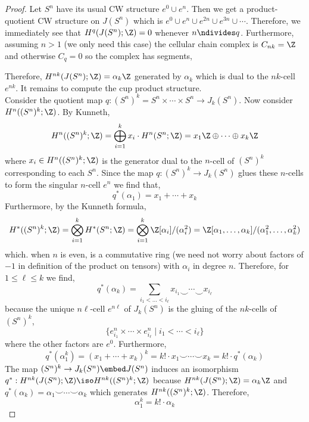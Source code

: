 \documentclass[12pt]{extarticle}
\begin{document}
\begin{proof}
Let $S^n$ have its usual CW structure $e^0 \cup e^n$. Then we get a product-quotient CW structure on $J(S^n)$ which is $e^0 \cup e^n \cup e^{2n} \cup e^{3n} \cup \cdots$. Therefore, we immediately see that $H^q(J(S^n); \Z) = 0$ whenever $n \ndivides q$. Furthermore, assuming $n > 1$ (we only need this case) the cellular chain complex is $C_{nk} = \Z$ and otherwise $C_q = 0$ so the complex has segments,
\begin{center}
\end{center}
Therefore, $H^{nk}(J(S^n); \Z) = \alpha_k \Z$ generated by $\alpha_k$ which is dual to the $nk$-cell $e^{nk}$. It remains to compute the cup product structure. 
\bigskip\\
Consider the quotient map $q : (S^n)^k = S^n \times \cdots \times S^n \to J_k(S^n)$. Now consider $H^n((S^n)^k; \Z)$. By Kunneth,
\[ H^n((S^n)^k; \Z) = \bigoplus_{i = 1}^k x_i \cdot H^n(S^n ; \Z) = x_1 \Z \oplus \cdots \oplus x_k \Z \]
where $x_i \in H^n((S^n)^k ; \Z)$ is the generator dual to the $n$-cell of $(S^n)^k$ corresponding to each $S^n$. Since the map $q : (S^n)^k \to J_k(S^n)$ glues these $n$-cells to form the singular $n$-cell $e^n$ we find that,
\[ q^*(\alpha_1) = x_1 + \cdots + x_k \]
Furthermore, by the Kunneth formula,
\[ H^*((S^n)^k ; \Z) = \bigotimes_{i = 1}^k H^*(S^n ; \Z) = \bigotimes_{i = 1}^k \Z[\alpha_i]/(\alpha_i^2) = \Z[\alpha_1, \dots, \alpha_k]/(\alpha_1^2, \dots, \alpha_k^2) \]
which. when $n$ is even, is a commutative ring (we need not worry about factors of $-1$ in definition of the product on tensors) with $\alpha_i$ in degree $n$. 
Therefore, for $1 \le \ell \le k$ we find,
\[ q^*(\alpha_k) = \sum_{i_1 < \dots < i_\ell} x_{i_1} \smile \cdots \smile x_{i_\ell} \]
because the unique $n\ell$-cell $e^{n\ell}$ of $J_k(S^n)$ is the gluing of the $nk$-cells of $(S^n)^k$,
\[ \{ e_{i_1}^{n} \times \cdots \times e_{i_\ell}^n \mid i_1 < \cdots < i_{\ell} \} \]
where the other factors are $e^0$. Furthermore,
\[ q^*(\alpha_1^k) = (x_1 + \cdots + x_k)^k = k! \cdot x_1 \smile \cdots \smile x_k = k! \cdot q^*(\alpha_k) \]
The map $(S^n)^k \to J_k(S^n) \embed J(S^n)$ induces an isomorphism $q^* : H^{nk}(J(S^n); \Z) \iso H^{nk}((S^n)^k ; \Z)$ because $H^{nk}(J(S^n); \Z) = \alpha_k \Z$ and $q^*(\alpha_k) = \alpha_1 \smile \cdots \smile \alpha_k$ which generates $H^{nk}((S^n)^k; \Z)$. Therefore,
\[ \alpha_1^k = k! \cdot \alpha_k \] 
\end{proof}
\end{document}
